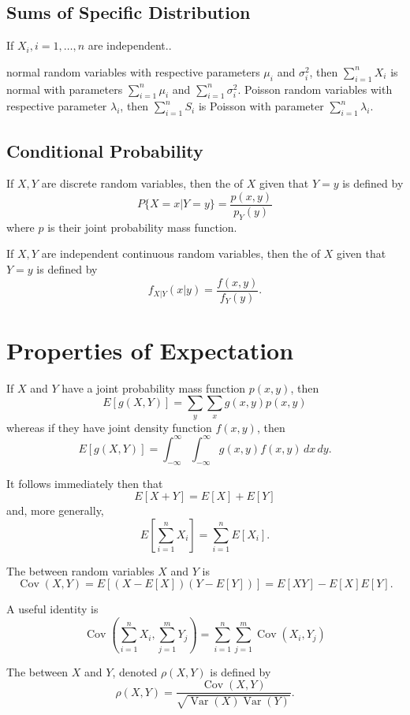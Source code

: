 \documentclass{article}
\DeclareMathOperator{\Var}{\textrm{Var}}
\DeclareMathOperator{\Cov}{\textrm{Cov}}
\begin{document}
\subsection{Sums of Specific Distribution}
\begin{theorem}
If $X_{i},i=1,\dotsc,n$ are independent..
    \begin{enumerate}
        \ii normal random variables with respective parameters $\mu_{i}$ and $\sigma^{2}_{i}$, then $\sum_{i=1}^{n}X_{i}$ is normal with parameters $\sum_{i=1}^{n}\mu_{i}$ and $\sum_{i=1}^{n}\sigma^{2}_{i}$.
        \ii Poisson random variables with respective parameter $\lambda_{i}$, then $\sum_{i=1}^{n}S_{i}$ is Poisson with parameter $\sum_{i=1}^{n}\lambda_{i}$.
    \end{enumerate}
\end{theorem}

\subsection{Conditional Probability}
\begin{definition}
    If $X,Y$ are discrete random variables, then the  of $X$ given that $Y=y$ is defined by
    \[P\{X=x|Y=y\}=\frac{p(x,y)}{p_{Y}(y)}\]where $p$ is their joint probability mass function. 
\end{definition}
    
\begin{definition}
    If $X,Y$ are independent continuous random variables, then the  of $X$ given that $Y=y$ is defined by 
    \[f_{X|Y}(x|y)=\frac{f(x,y)}{f_{Y}(y)}.\]
\end{definition}

\section{Properties of Expectation}
If $X$ and $Y$ have a joint probability mass function $p(x,y)$, then 
\[E[g(X,Y)]=\sum_{y}\sum_{x}g(x,y)p(x,y)\]whereas if they have joint density function $f(x,y)$, then
\[E[g(X,Y)]=\int_{-\infty}^{\infty}\int_{-\infty}^{\infty}g(x,y)f(x,y)\,dx\,dy.\]
\begin{corollary}
    It follows immediately then that
    \[E[X+Y]=E[X]+E[Y]\]
    and, more generally, 
    \[E\left[\sum_{i=1}^{n}X_{i}\right]=\sum_{i=1}^{n}E[X_{i}].\]
\end{corollary}
\begin{definition}
    The  between random variables $X$ and $Y$ is
    \[\Cov(X,Y)=E[(X-E[X])(Y-E[Y])]=E[XY]-E[X]E[Y].\]
\end{definition}
\begin{remark}
    A useful identity is 
    \[\Cov\left(\sum_{i=1}^{n}X_{i},\sum_{j=1}^{m}Y_{j}\right)=\sum_{i=1}^{n}\sum_{j=1}^{m}\Cov(X_{i},Y_{j})\]
\end{remark}
\begin{definition}
    The  between $X$ and $Y$, denoted $\rho(X,Y)$ is defined by 
    \[\rho(X,Y)=\frac{\Cov(X,Y)}{\sqrt{\Var(X)\Var(Y)}}.\]
\end{definition}
\end{document}
